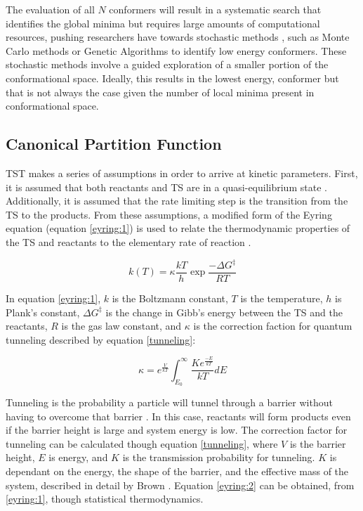 \documentclass[preprint, 11pt]{elsarticle} %
\begin{document}
The evaluation of all $N$ conformers will result in a systematic search that identifies the global minima but requires large amounts of computational resources, pushing researchers have towards stochastic methods \cite{Ebejer:2012}, such as Monte Carlo methods or Genetic Algorithms to identify low energy conformers. 
These stochastic methods involve a guided exploration of a smaller portion of the conformational space.
Ideally, this results in the lowest energy, conformer but that is not always the case given the number of local minima present in conformational space.


\subsection{Canonical Partition Function}

TST makes a series of assumptions in order to arrive at kinetic parameters. 
First, it is assumed that both reactants and TS are in a quasi-equilibrium state \cite{QSS:2017}.
Additionally, it is assumed that the rate limiting step is the transition from the TS to the products. 
From these assumptions, a modified form of the Eyring equation (equation \ref{eyring:1}) is used to relate the thermodynamic properties of the TS and reactants to the elementary rate of reaction \cite{eyring:1935}.

\begin{equation}
    k(T) = \kappa \frac{k T}{h} \exp{\frac{-\Delta G^\ddagger}{RT}}
    \label{eyring:1}
\end{equation}

In equation \ref{eyring:1}, $k$ is the Boltzmann constant, $T$ is the temperature, $h$ is Plank's constant, $\Delta G^\ddagger$ is the change in Gibb's energy between the TS and the reactants,  $R$ is the gas law constant, and $\kappa$ is the correction faction for quantum tunneling described by equation \ref{tunneling}:

\begin{equation}
    \kappa = e^{\frac{V}{kT}} \int^{\infty}_{E_0} \frac{K e^{\frac{-E}{kT}}}{kT} dE
    \label{tunneling}
\end{equation}

Tunneling is the probability a particle will tunnel through a barrier without having to overcome that barrier \cite{RUBAKOV:1984}.
In this case, reactants will form products even if the barrier height is large and system energy is low. 
The correction factor for tunneling can be calculated though equation \ref{tunneling}, where $V$ is the barrier height, $E$ is energy, and $K$ is the transmission probability for tunneling.
$K$ is dependant on the energy, the shape of the barrier, and the effective mass of the system, described in detail by Brown \cite{Brown:1981}.
Equation \ref{eyring:2} can be obtained, from \ref{eyring:1}, though statistical thermodynamics.
\end{document}
